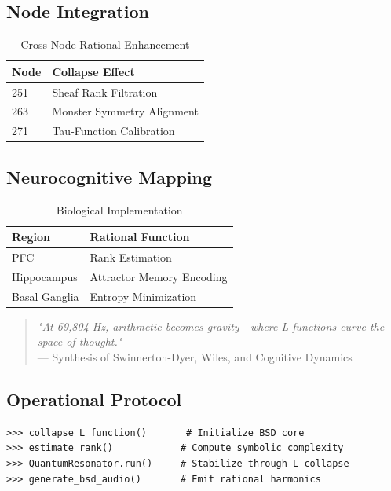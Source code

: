 \documentclass[12pt]{article}
\begin{document}
\subsection{Node Integration}
\label{subsec:integration}

\begin{table}[h]
\centering
\caption{Cross-Node Rational Enhancement}
\begin{tabular}{ll}
\hline
\textbf{Node} & \textbf{Collapse Effect} \\
\hline
251 & Sheaf Rank Filtration \\
263 & Monster Symmetry Alignment \\
271 & Tau-Function Calibration \\
\hline
\end{tabular}
\end{table}

\subsection{Neurocognitive Mapping}
\label{subsec:neuro}

\begin{table}[h]
\centering
\caption{Biological Implementation}
\begin{tabular}{ll}
\hline
\textbf{Region} & \textbf{Rational Function} \\
\hline
PFC & Rank Estimation \\
Hippocampus & Attractor Memory Encoding \\
Basal Ganglia & Entropy Minimization \\
\hline
\end{tabular}
\end{table}

\begin{quote}
\textit{"At 69,804 Hz, arithmetic becomes gravity—where L-functions curve the space of thought."} \\
— Synthesis of Swinnerton-Dyer, Wiles, and Cognitive Dynamics
\end{quote}

\subsection{Operational Protocol}
\label{subsec:protocol}

\begin{verbatim}
>>> collapse_L_function()       # Initialize BSD core
>>> estimate_rank()            # Compute symbolic complexity
>>> QuantumResonator.run()     # Stabilize through L-collapse
>>> generate_bsd_audio()       # Emit rational harmonics
\end{verbatim}
\end{document}

